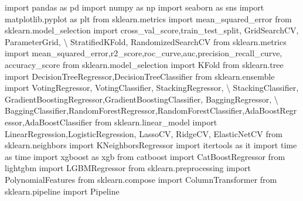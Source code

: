 \documentclass[
  letterpaper,
  DIV=11,
  numbers=noendperiod]{scrreprt}
\newenvironment{Shaded}{\begin{snugshade}}{\end{snugshade}}
\newcommand{\ImportTok}[1]{\textcolor[rgb]{0.00,0.46,0.62}{#1}}
\newcommand{\NormalTok}[1]{\textcolor[rgb]{0.00,0.23,0.31}{#1}}
\newcommand{\OperatorTok}[1]{\textcolor[rgb]{0.37,0.37,0.37}{#1}}
\begin{document}
\begin{Shaded}
\begin{Highlighting}[]
\ImportTok{import}\NormalTok{ pandas }\ImportTok{as}\NormalTok{ pd}
\ImportTok{import}\NormalTok{ numpy }\ImportTok{as}\NormalTok{ np}
\ImportTok{import}\NormalTok{ seaborn }\ImportTok{as}\NormalTok{ sns}
\ImportTok{import}\NormalTok{ matplotlib.pyplot }\ImportTok{as}\NormalTok{ plt}
\ImportTok{from}\NormalTok{ sklearn.metrics }\ImportTok{import}\NormalTok{ mean\_squared\_error}
\ImportTok{from}\NormalTok{ sklearn.model\_selection }\ImportTok{import}\NormalTok{ cross\_val\_score,train\_test\_split, GridSearchCV, ParameterGrid, }\OperatorTok{\textbackslash{}}
\NormalTok{StratifiedKFold, RandomizedSearchCV}
\ImportTok{from}\NormalTok{ sklearn.metrics }\ImportTok{import}\NormalTok{ mean\_squared\_error,r2\_score,roc\_curve,auc,precision\_recall\_curve, accuracy\_score}
\ImportTok{from}\NormalTok{ sklearn.model\_selection }\ImportTok{import}\NormalTok{ KFold}
\ImportTok{from}\NormalTok{ sklearn.tree }\ImportTok{import}\NormalTok{ DecisionTreeRegressor,DecisionTreeClassifier}
\ImportTok{from}\NormalTok{ sklearn.ensemble }\ImportTok{import}\NormalTok{ VotingRegressor, VotingClassifier, StackingRegressor, }\OperatorTok{\textbackslash{}}
\NormalTok{StackingClassifier, GradientBoostingRegressor,GradientBoostingClassifier, BaggingRegressor, }\OperatorTok{\textbackslash{}}
\NormalTok{BaggingClassifier,RandomForestRegressor,RandomForestClassifier,AdaBoostRegressor,AdaBoostClassifier}
\ImportTok{from}\NormalTok{ sklearn.linear\_model }\ImportTok{import}\NormalTok{ LinearRegression,LogisticRegression, LassoCV, RidgeCV, ElasticNetCV}
\ImportTok{from}\NormalTok{ sklearn.neighbors }\ImportTok{import}\NormalTok{ KNeighborsRegressor}
\ImportTok{import}\NormalTok{ itertools }\ImportTok{as}\NormalTok{ it}
\ImportTok{import}\NormalTok{ time }\ImportTok{as}\NormalTok{ time}
\ImportTok{import}\NormalTok{ xgboost }\ImportTok{as}\NormalTok{ xgb}
\ImportTok{from}\NormalTok{ catboost }\ImportTok{import}\NormalTok{ CatBoostRegressor}
\ImportTok{from}\NormalTok{ lightgbm }\ImportTok{import}\NormalTok{ LGBMRegressor}
\ImportTok{from}\NormalTok{ sklearn.preprocessing }\ImportTok{import}\NormalTok{ PolynomialFeatures}
\ImportTok{from}\NormalTok{ sklearn.compose }\ImportTok{import}\NormalTok{ ColumnTransformer}
\ImportTok{from}\NormalTok{ sklearn.pipeline }\ImportTok{import}\NormalTok{ Pipeline}
\end{Highlighting}
\end{Shaded}
\end{document}
